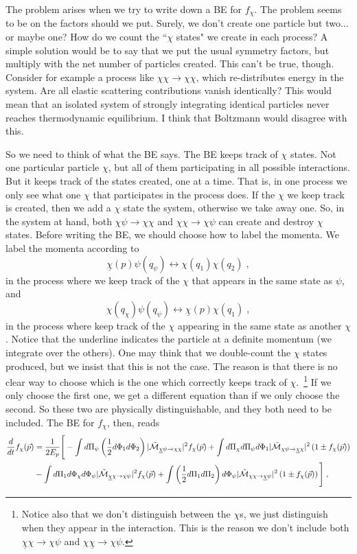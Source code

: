 \documentclass[11pt,a4paper]{article}
\begin{document}
The problem arises when we try to write down a BE for $f_\chi$. The problem seems to be on the factors should we put. Surely, we don't create one particle but two... or maybe one? How do we count the ``$\chi$ states" we create in each process? A simple solution would be to say that we put the usual symmetry factors, but multiply with the net number of particles created. This can't be true, though. Consider for example a process like $\chi \chi \to \chi \chi$, which re-distributes energy in the system. Are all elastic scattering contributions vanish identically? This would mean that an isolated system of strongly integrating identical particles never reaches thermodynamic equilibrium. I think that Boltzmann would disagree with this. 

So we need to think of what the BE says. The BE keeps track of $\chi$ states. Not one particular particle $\chi$, but all of them participating in all possible interactions. But it keeps track of the states created, one at a time. That is, in one process we only see what one $\chi$ that participates in the process does. If the $\chi$ we keep track  is created, then we add a $\chi$ state the system, otherwise we take away one. So, in the system at hand, both $\chi \psi \to \chi \chi $ and $\chi \chi \to \chi \psi $ can create and destroy $\chi$ states. Before writing the BE, we should choose how to label the momenta. We label the momenta according to
%
$$
\underline{\chi}(p) \psi(q_\psi) \leftrightarrow \chi(q_1)\chi(q_2) \; ,
$$
in the process where we keep track of the $\chi$ that appears in the same state as $\psi$, and 
%
$$
\chi(q_\chi) \psi(q_\psi) \leftrightarrow \underline{\chi}(p)\chi(q_1) \; ,
$$
%
in the process where keep track of the $\chi$ appearing in the same state as another $\chi$. Notice that the underline indicates the particle at a definite momentum (we integrate over the others). One may think that we double-count the $\chi$ states produced, but we insist that this is not the case. The reason is that there is no clear way to choose which is the one which correctly keeps track of $\chi$.~\footnote{Notice also that we don't distinguish between the $\chi$s, we just distinguish when they appear in the interaction. This is the reason we don't include both   $\underline{\chi} \chi \to \chi \psi$ and $\chi\underline{\chi}  \to \chi \psi$. }  If we only choose the first one, we get a different equation than if we only choose the second. So these two are physically distinguishable, and they both need to be included. The BE for $f_\chi$, then, reads
%
\begin{eqnarray}
\dfrac{d}{dt} f_{\chi }(\vec{p}) &= \dfrac{1}{2E_p} \lrBiggsb{
	-\dint d\Pi_{\psi} \lrb{\dfrac{1}{2} d\Phi_{1} d\Phi_{2}}   \tM{\underline{\chi} \psi}{\chi \chi } f_{\chi }(\vec{p} )
	+ \dint d\Pi_{\chi} d\Pi_{\psi} d\Phi_{1}  \tM{\chi \psi }{\underline{\chi} \chi} \lrb{1\pm f_{\chi }(\vec{p})} 
	\nonumber \\
	&- \dint d\Pi_{1} d\Phi_{\chi} d\Phi_{\psi}   \tM{\underline{\chi} \chi}{\chi \psi } f_{\chi }(\vec{p})
	+ \dint \lrb{\dfrac{1}{2} d\Pi_{1} d\Pi_{2}} d\Phi_{\psi}  \tM{\chi \chi }{\underline{\chi} \psi} \lrb{1\pm f_{\chi }(\vec{p})}
} \;,
%
\label{eq:BE_22-chi}
\end{eqnarray}  
\end{document}
